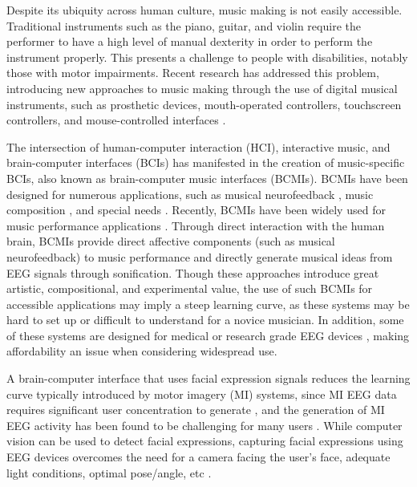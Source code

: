 Despite its ubiquity across human culture, music making is not easily accessible. Traditional instruments such as the piano, guitar, and violin require the performer to have a high level of manual dexterity in order to perform the instrument properly. This presents a challenge to people with disabilities, notably those with motor impairments. Recent research has addressed this problem, introducing new approaches to music making through the use of digital musical instruments, such as prosthetic devices, mouth-operated controllers, touchscreen controllers, and mouse-controlled interfaces \cite{15}.

The intersection of human-computer interaction (HCI), interactive music, and brain-computer interfaces (BCIs) has manifested in the creation of music-specific BCIs, also known as brain-computer music interfaces (BCMIs). BCMIs have been designed for numerous applications, such as musical neurofeedback \cite{2}, music composition \cite{3}, and special needs \cite{1}. Recently, BCMIs have been widely used for music performance applications \cite{5, 8, 7, 6, 3, 10, 9}. Through direct interaction with the human brain, BCMIs provide direct affective components (such as musical neurofeedback) to music performance and directly generate musical ideas from EEG signals through sonification. Though these approaches introduce great artistic, compositional, and experimental value, the use of such BCMIs for accessible applications may imply a steep learning curve, as these systems may be hard to set up or difficult to understand for a novice musician. In addition, some of these systems are designed for medical or research grade EEG devices \cite{3, 10, 8}, making affordability an issue when considering widespread use. 

A brain-computer interface that uses facial expression signals reduces the learning curve typically introduced by motor imagery (MI) systems, since MI EEG data requires significant user concentration to generate \cite{inMIdefense3}, and the generation of MI EEG activity has been found to be challenging for many users \cite{inMIdefense1}. While computer vision can be used to detect facial expressions, capturing facial expressions using EEG devices overcomes the need for a camera facing the user’s face, adequate light conditions, optimal pose/angle, etc \cite{facialexpressionpaper2,facialexpressionpaper}.

